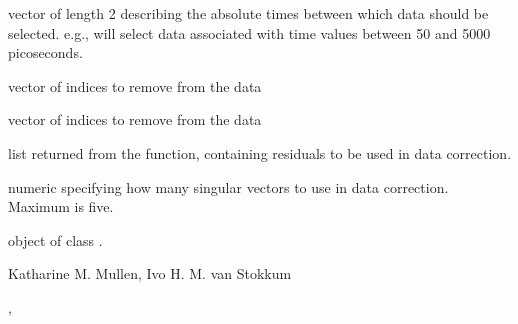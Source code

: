 \begin{Arguments}
\begin{ldescription}
\item[\code{sel\_time\_ab}] vector of length 2 describing the absolute times 
between which data should be
selected.   e.g.,  will select data  
associated with time values between 50 and 5000 picoseconds.
\item[\code{rm\_x2}] vector of  indices to remove from the data
\item[\code{rm\_x}] vector of  indices to remove from the data
\item[\code{svdResid}] list returned from the  function, containing
residuals to be used in data correction. 
\item[\code{numV}] numeric specifying how many singular vectors to use in data
correction.  Maximum is five. 
\end{ldescription}
\end{Arguments}
\begin{Value}
object of class .
\end{Value}
\begin{Author}\relax
Katharine M. Mullen, Ivo H. M. van Stokkum
\end{Author}
\begin{SeeAlso}\relax
{}, 
\end{SeeAlso}


